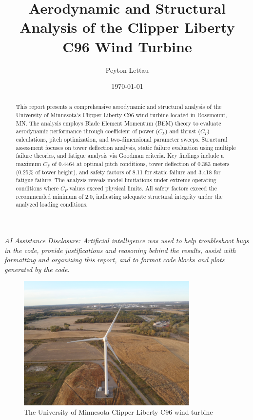 \documentclass[11pt]{article}
\title{Aerodynamic and Structural Analysis of the Clipper Liberty C96 Wind Turbine}
\author{Peyton Lettau}
\date{\today}
\begin{document}
\maketitle

\begin{center}
\begin{minipage}{0.9\textwidth}
\small\textit{AI Assistance Disclosure: Artificial intelligence was used to help troubleshoot bugs in the code, provide justifications and reasoning behind the results, assist with formatting and organizing this report, and to format code blocks and plots generated by the code.}
\end{minipage}
\end{center}

\begin{abstract}
This report presents a comprehensive aerodynamic and structural analysis of the University of Minnesota's Clipper Liberty C96 wind turbine located in Rosemount, MN. The analysis employs Blade Element Momentum (BEM) theory to evaluate aerodynamic performance through coefficient of power ($C_P$) and thrust ($C_T$) calculations, pitch optimization, and two-dimensional parameter sweeps. Structural assessment focuses on tower deflection analysis, static failure evaluation using multiple failure theories, and fatigue analysis via Goodman criteria. Key findings include a maximum $C_P$ of 0.4464 at optimal pitch conditions, tower deflection of 0.383 meters (0.25\% of tower height), and safety factors of 8.11 for static failure and 3.418 for fatigue failure. The analysis reveals model limitations under extreme operating conditions where $C_P$ values exceed physical limits. All safety factors exceed the recommended minimum of 2.0, indicating adequate structural integrity under the analyzed loading conditions.
\end{abstract}

\begin{figure}[H]
  \centering
  \includegraphics[width=0.8\textwidth]{../../PNGS/UMN turbine.jpg}
  \caption{The University of Minnesota Clipper Liberty C96 wind turbine}
  \label{fig:umn_turbine_photo}
\end{figure}
\end{document}
